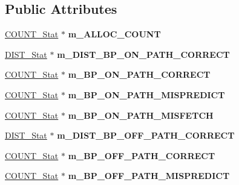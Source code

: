 \subsection*{Public Attributes}
\begin{DoxyCompactItemize}
\item 
\hypertarget{classall__stats__c_ab72bd1e379caf7c23467eeafb85f0a3b}{
\hyperlink{classCOUNT__Stat}{COUNT\_\-Stat} $\ast$ {\bfseries m\_\-ALLOC\_\-COUNT}}
\label{classall__stats__c_ab72bd1e379caf7c23467eeafb85f0a3b}

\item 
\hypertarget{classall__stats__c_a953d0728ff8eaf5cf14bc8db12ad8baa}{
\hyperlink{classDIST__Stat}{DIST\_\-Stat} $\ast$ {\bfseries m\_\-DIST\_\-BP\_\-ON\_\-PATH\_\-CORRECT}}
\label{classall__stats__c_a953d0728ff8eaf5cf14bc8db12ad8baa}

\item 
\hypertarget{classall__stats__c_a0e11358bdd69061905e1810bf813728f}{
\hyperlink{classCOUNT__Stat}{COUNT\_\-Stat} $\ast$ {\bfseries m\_\-BP\_\-ON\_\-PATH\_\-CORRECT}}
\label{classall__stats__c_a0e11358bdd69061905e1810bf813728f}

\item 
\hypertarget{classall__stats__c_a38eec83d60bf60528c1b86f09eb5f0a1}{
\hyperlink{classCOUNT__Stat}{COUNT\_\-Stat} $\ast$ {\bfseries m\_\-BP\_\-ON\_\-PATH\_\-MISPREDICT}}
\label{classall__stats__c_a38eec83d60bf60528c1b86f09eb5f0a1}

\item 
\hypertarget{classall__stats__c_a5b7a45a7994ebfbf737bae6177fac9d7}{
\hyperlink{classCOUNT__Stat}{COUNT\_\-Stat} $\ast$ {\bfseries m\_\-BP\_\-ON\_\-PATH\_\-MISFETCH}}
\label{classall__stats__c_a5b7a45a7994ebfbf737bae6177fac9d7}

\item 
\hypertarget{classall__stats__c_a51a92a26c0519fa769cc6944e4226c37}{
\hyperlink{classDIST__Stat}{DIST\_\-Stat} $\ast$ {\bfseries m\_\-DIST\_\-BP\_\-OFF\_\-PATH\_\-CORRECT}}
\label{classall__stats__c_a51a92a26c0519fa769cc6944e4226c37}

\item 
\hypertarget{classall__stats__c_a14151d28fbefb9f592c105150a90fae5}{
\hyperlink{classCOUNT__Stat}{COUNT\_\-Stat} $\ast$ {\bfseries m\_\-BP\_\-OFF\_\-PATH\_\-CORRECT}}
\label{classall__stats__c_a14151d28fbefb9f592c105150a90fae5}

\item 
\hypertarget{classall__stats__c_a80a4530c5eee79cb4d85fbdc4e319c8f}{
\hyperlink{classCOUNT__Stat}{COUNT\_\-Stat} $\ast$ {\bfseries m\_\-BP\_\-OFF\_\-PATH\_\-MISPREDICT}}
\label{classall__stats__c_a80a4530c5eee79cb4d85fbdc4e319c8f}


\end{DoxyCompactItemize}
